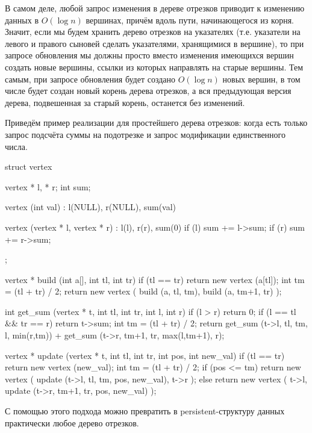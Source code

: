 В самом деле, любой запрос изменения в дереве отрезков приводит к изменению данных в $O (\log n)$ вершинах, причём вдоль пути, начинающегося из корня. Значит, если мы будем хранить дерево отрезков на указателях (т.е. указатели на левого и правого сыновей сделать указателями, хранящимися в вершине), то при запросе обновления мы должны просто вместо изменения имеющихся вершин создать новые вершины, ссылки из которых направлять на старые вершины. Тем самым, при запросе обновления будет создано $O (\log n)$ новых вершин, в том числе будет создан новый корень дерева отрезков, а вся предыдующая версия дерева, подвешенная за старый корень, останется без изменений.

Приведём пример реализации для простейшего дерева отрезков: когда есть только запрос подсчёта суммы на подотрезке и запрос модификации единственного числа.

\code
struct vertex {
	vertex * l, * r;
	int sum;

	vertex (int val)
		: l(NULL), r(NULL), sum(val)
	{ }

	vertex (vertex * l, vertex * r)
		: l(l), r(r), sum(0)
	{
		if (l)  sum += l->sum;
		if (r)  sum += r->sum;
	}
};

vertex * build (int a[], int tl, int tr) {
	if (tl == tr)
		return new vertex (a[tl]);
	int tm = (tl + tr) / 2;
	return new vertex (
		build (a, tl, tm),
		build (a, tm+1, tr)
	);
}

int get_sum (vertex * t, int tl, int tr, int l, int r) {
	if (l > r)
		return 0;
	if (l == tl && tr == r)
		return t->sum;
	int tm = (tl + tr) / 2;
	return get_sum (t->l, tl, tm, l, min(r,tm))
		+ get_sum (t->r, tm+1, tr, max(l,tm+1), r);
}

vertex * update (vertex * t, int tl, int tr, int pos, int new_val) {
	if (tl == tr)
		return new vertex (new_val);
	int tm = (tl + tr) / 2;
	if (pos <= tm)
		return new vertex (
				update (t->l, tl, tm, pos, new_val),
				t->r
			);
	else
		return new vertex (
				t->l,
				update (t->r, tm+1, tr, pos, new_val)
			);
}
\endcode

С помощью этого подхода можно превратить в persistent-структуру данных практически любое дерево отрезков.
